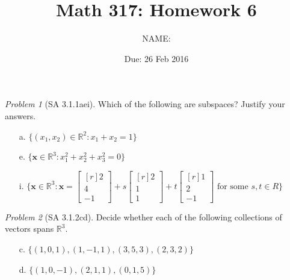 \documentclass[fleqn,11pt]{paper}
\author         {NAME:                     }
\title{Math 317: Homework 6}
\date{Due: 26 Feb 2016}
\theoremstyle{remark}
\newtheorem{problem}{Problem}
\newtheorem*{solution}{{\bf Solution}}
\newcommand\R{\fld{R}}
\renewcommand{\vec}[1]{\mathbf{#1}}
\newcommand{\<}{\ensuremath{\langle}}
\renewcommand{\>}{\ensuremath{\rangle}}
\newcommand\fld[1]{\ensuremath{\mathbb{#1}}}
\newcommand\vx{\vec{x}}
\begin{document}
\maketitle

\begin{problem}[SA 3.1.1aei]
Which of the following are subspaces? Justify your answers.
\begin{enumerate}
\item[a.] $\{(x_1, x_2) \in \R^2: x_1 + x_2 = 1\}$
\item[e.] $\{\vx \in \R^3 : x_1^2 + x_2^2+ x_3^2 = 0\}$
\item[i.] $\{\vx \in \R^3: \vx = \begin{bmatrix*}[r] 2\\4\\-1\end{bmatrix*} 
+s\begin{bmatrix*}[r] 2\\1\\1\end{bmatrix*} 
+t\begin{bmatrix*}[r] 1\\2\\-1\end{bmatrix*} \text{ for some } s, t \in R\}$
\end{enumerate}
\end{problem}
\newpage

\begin{problem}[SA 3.1.2cd]
Decide whether each of the following collections of vectors spans $\R^3$.
\begin{enumerate}
\item[c.] $\{(1, 0, 1), (1, -1, 1), (3, 5, 3), (2, 3, 2)\}$
\item[d.] $\{(1, 0, -1), (2, 1, 1), (0, 1, 5)\}$
\end{enumerate}
\end{problem}
\newpage
\end{document}
